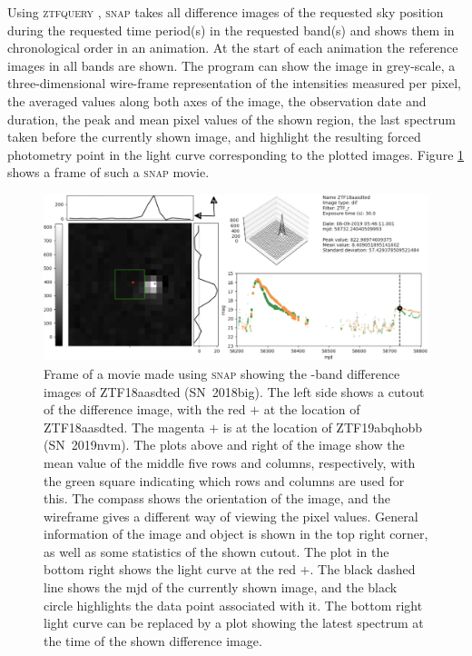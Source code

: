 \documentclass[a4paper,oneside,12pt, class=Latex/Classes/PhDthesisPSnPDF, crop=false]{standalone}
\begin{document}
Using \textsc{ztfquery} \citep{ZTFquery}, \textsc{snap} takes all difference images of the requested sky position during the requested time period(s) in the requested band(s) and shows them in chronological order in an animation. At the start of each animation the reference images in all bands are shown. The program can show the image in grey-scale, a three-dimensional wire-frame representation of the intensities measured per pixel, the averaged values along both axes of the image, the observation date and duration, the peak and mean pixel values of the shown region, the last spectrum taken before the currently shown image, and highlight the resulting forced photometry point in the light curve corresponding to the plotted images. Figure \ref{snap_showcase} shows a frame of such a \textsc{snap} movie.

\begin{figure}
 \centering
 \includegraphics[width=\textwidth]{../Images/chapter_3/snap_showcase.png}
 \caption[Example frame from the SuperNova Animation Program (\textsc{snap}).]{Frame of a movie made using \textsc{snap} showing the \ztfr-band difference images of ZTF18aasdted (SN~2018big). The left side shows a cutout of the difference image, with the red $\plus$ at the location of ZTF18aasdted. The magenta $\plus$ is at the location of ZTF19abqhobb (SN~2019nvm). The plots above and right of the image show the mean value of the middle five rows and columns, respectively, with the green square indicating which rows and columns are used for this. The compass shows the orientation of the image, and the wireframe gives a different way of viewing the pixel values. General information of the image and object is shown in the top right corner, as well as some statistics of the shown cutout. The plot in the bottom right shows the light curve at the red $\plus$. The black dashed line shows the mjd of the currently shown image, and the black circle highlights the data point associated with it. The bottom right light curve can be replaced by a plot showing the latest spectrum at the time of the shown difference image.}
 \label{snap_showcase}
\end{figure}
\end{document}

